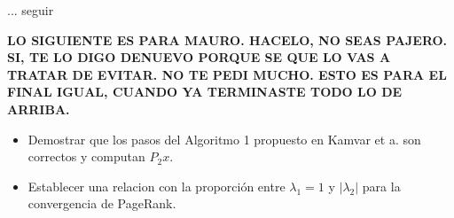 ... seguir

\textbf{LO SIGUIENTE ES PARA MAURO. HACELO, NO SEAS PAJERO. SI, TE LO DIGO DENUEVO PORQUE SE QUE LO VAS A TRATAR DE EVITAR. NO TE PEDI MUCHO. ESTO ES PARA EL FINAL IGUAL, CUANDO YA TERMINASTE TODO LO DE ARRIBA.}

\begin{itemize}
\item Demostrar que los pasos del Algoritmo 1 propuesto en Kamvar et a. son correctos y computan $P_2x$.
\item Establecer una relacion con la proporción entre $\lambda_1 = 1$  y $|\lambda_2|$ para la convergencia de PageRank.
\end{itemize}
\fi